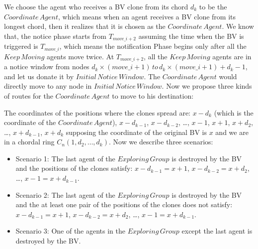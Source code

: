 \documentclass[conference]{IEEEtran}
\begin{document}

We choose the agent who receives a BV clone from its chord $d_k$ to be the $Coordinate\,Agent$, which means when an agent receives a BV clone from its longest chord, then it realizes that it is chosen as the $Coordinate\, Agent$. We know that, the notice phase starts from $T_{move\_{i+2}}$ assuming the time when the BV is triggered is $T_{move\_i}$, which means the notification Phase begins only after all the $Keep\,Moving$ agents move twice. At $T_{move\_{i+2}}$, all the $Keep\,Moving$ agents are in a notice window from nodes $d_k\times(move\_{i}+1)\,to\,d_k\times(move\_{i}+1) + d_{k}-1$, and let us donate it by $Initial\,Notice\,Window$. The $Coordinate\,Agent$ would directly move to any node in $Initial\,Notice\,Window$. Now we propose three kinds of routes for the $Coordinate\,Agent$ to move to his destination:

The coordinates of the positions where the clones spread are: $x-d_k$ (which is the coordinate of the $Coordinate\,Agent$), $x-d_{k-1}$, $x-d_{k-2}$, \ldots, $x-1$, $x+1$, $x+d_2$, \ldots, $x+d_{k-1}$, $x+d_{k}$ supposing the coordinate of the original BV is $x$ and we are in a chordal ring $C_n(1, d_2,\ldots, d_k)$.
 Now we describe three scenarios:
\begin{itemize}
\item Scenario 1: The last agent of the $Exploring\,Group$ is destroyed by the BV and the positions of the clones satisfy: $x-d_{k-1}=x+1$, $x-d_{k-2}=x+d_2$, \ldots, $x-1=x+d_{k-1}$. 
\item Scenario 2: The last agent of the $Exploring\,Group$ is destroyed by the BV and the at least one pair of the positions of the clones does not satisfy: $x-d_{k-1}=x+1$, $x-d_{k-2}=x+d_2$, \ldots, $x-1=x+d_{k-1}$. 
\item Scenario 3: One of the agents in the $Exploring\,Group$ except the last agent is destroyed by the BV.
\end{itemize}
\end{document}

